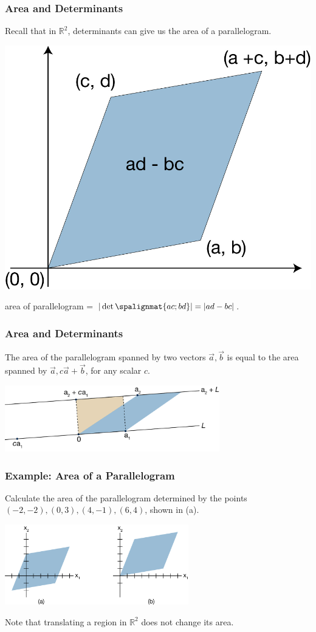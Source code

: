 \begin{frame}\frametitle{Area and Determinants}

    Recall that in $\mathbb R^2$, determinants can give us the area of a parallelogram.
    
    \pause 
    \begin{center}
    \includegraphics[width=.4\textwidth]{Chapter3/images/image002.jpg} 
    \end{center}
    
    \pause 
    area of parallelogram =  $| \det \spalignmat{a c;b d} | = | ad - bc |$. 

\end{frame}



\begin{frame}\frametitle{Area and Determinants}


 The area of the parallelogram spanned by two vectors $ \vec a, \vec b$ is equal to the area spanned 
by $ \vec a , c\vec a + \vec b$, for any scalar $ c$.   
 
\begin{center}
\includegraphics[width=0.7\textwidth]{Chapter3/images/image003.jpg} 
\end{center}

\end{frame}




\begin{frame}\frametitle{Example: Area of a Parallelogram}
    Calculate the area of the parallelogram determined by the points $(-2, -2), (0, 3), (4, -1)  ,(6, 4)$, shown in (a). 
    
    \begin{center}
    \includegraphics[width=0.6\textwidth]{Chapter3/images/image001.jpg}  
    \end{center}
    
    Note that translating a region in $\mathbb R^2$ does not change its area. 
\end{frame}


